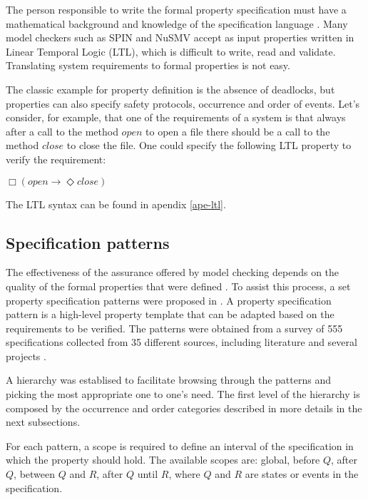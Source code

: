 The person responsible to write the formal property specification must have a mathematical background and knowledge of the specification language \cite{Prospec}. Many model checkers such as SPIN and NuSMV accept as input properties written in Linear Temporal Logic (LTL), which is difficult to write, read and validate. Translating system requirements to formal properties is not easy.

The classic example for property definition is the absence of deadlocks, but properties can also specify safety protocols\cite{Merz}, occurrence and order of events. Let's consider, for example, that one of the requirements of a system is that always after a call to the method $open$ to open a file there should be a call to the method $close$ to close the file. One could specify the following LTL property to verify the requirement:

\begin{center}
$\Box (open \rightarrow \Diamond close)$
\end{center}

The LTL syntax can be found in apendix \ref{ape-ltl}.

\subsection{Specification patterns}


The effectiveness of the assurance offered by model checking depends on the quality of the formal properties that were defined \cite{Prospec}. To assist this process, a set property specification patterns were proposed in \cite{dwyer98}. A property specification pattern is a high-level property template that can be adapted based on the requirements to be verified. The patterns were obtained from a survey of 555 specifications collected from 35 different sources, including literature and several projects \cite{dwyer99:specpatt_survey}.

A hierarchy was establised to facilitate browsing through the patterns and picking the most appropriate one to one's need. The first level of the hierarchy is composed by the occurrence and order categories described in more details in the next subsections.

For each pattern, a scope is required to define an interval of the specification in which the property should hold. The available scopes are: global, before $Q$, after $Q$, between $Q$ and $R$, after $Q$ until $R$, where $Q$ and $R$ are states or events in the specification.

